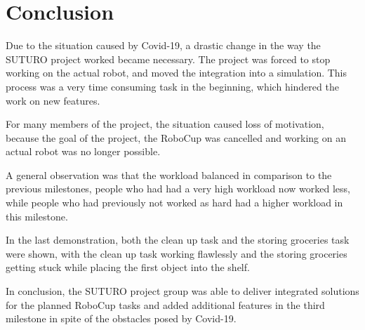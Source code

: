 \documentclass[main.tex]{subfiles}
\begin{document}
	
	\chapter{Conclusion}
	Due to the situation caused by Covid-19, a drastic change in the way the SUTURO project worked became necessary.  The project was forced to stop working on the actual robot, and moved the integration into a simulation. This process was a very time consuming task in the beginning, which hindered the work on new features.
	
	For many members of the project, the situation caused loss of motivation, because the goal of the project, the RoboCup was cancelled and working on an actual robot was no longer possible. 
	
	A general observation was that the workload balanced in comparison to the previous milestones, people who had had a very high workload now worked less, while people who had previously not worked as hard had a higher workload in this milestone.
	
	In the last demonstration, both the clean up task and the storing groceries task were shown, with the clean up task working flawlessly and the storing groceries getting stuck while placing the first object into the shelf.
	
	In conclusion, the SUTURO project group was able to deliver integrated solutions for the planned RoboCup tasks and added additional features in the third milestone in spite of the obstacles posed by Covid-19. 


	
\end{document}
